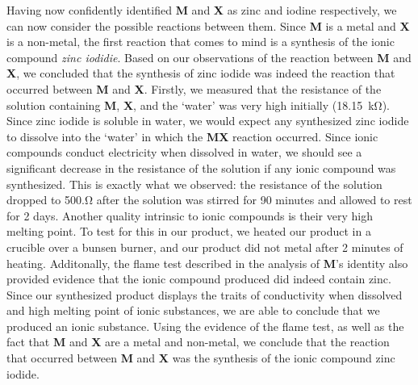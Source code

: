 \documentclass[titlepage]{article}
\begin{document}
Having now confidently identified \textbf{M} and \textbf{X} as zinc and iodine respectively, we can now consider the possible reactions between them. Since \textbf{M} is a metal and \textbf{X} is a non-metal, the first reaction that comes to mind is a synthesis of the ionic compound \emph{zinc iodidie}. Based on our observations of the reaction between \textbf{M} and \textbf{X}, we concluded that the synthesis of zinc iodide was indeed the reaction that occurred between \textbf{M} and \textbf{X}. Firstly, we measured that the resistance of the solution containing \textbf{M}, \textbf{X}, and the `water' was very high initially (\qty{18.15}{\kilo\ohm}). Since zinc iodide is soluble in water, we would expect any synthesized zinc iodide to dissolve into the `water' in which the \textbf{MX} reaction occurred. Since ionic compounds conduct electricity when dissolved in water, we should see a significant decrease in the resistance of the solution if any ionic compound was synthesized. This is exactly what we observed: the resistance of the solution dropped to 500.\unit{\ohm} after the solution was stirred for 90 minutes and allowed to rest for 2 days. Another quality intrinsic to ionic compounds is their very high melting point. To test for this in our product, we heated our product in a crucible over a bunsen burner, and our product did not metal after 2 minutes of heating. Additonally, the flame test described in the analysis of \textbf{M}'s identity also provided evidence that the ionic compound produced did indeed contain zinc. Since our synthesized product displays the traits of conductivity when dissolved and high melting point of ionic substances, we are able to conclude that we produced an ionic substance. Using the evidence of the flame test, as well as the fact that \textbf{M} and \textbf{X} are a metal and non-metal, we conclude that the reaction that occurred between \textbf{M} and \textbf{X} was the synthesis of the ionic compound zinc iodide. 






% 
% 
% 
\end{document}
